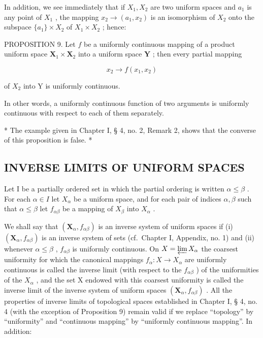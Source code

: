 In addition, we see immediately that if \(X_{1}, X_{2}\) are two uniform spaces and \(a_{1}\) is any point of \(X_{1}\) , the mapping \(x_{2} \to (a_{1}, x_{2})\) is an isomorphism of \(X_{2}\) onto the subspace \(\{a_{1}\} \times X_{2}\) of \(X_{1} \times X_{2}\) ; hence:

PROPOSITION 9. Let \(f\) be a uniformly continuous mapping of a product uniform space \(\mathbf{X}_1 \times \mathbf{X}_2\) into a uniform space \(\mathbf{Y}\) ; then every partial mapping

\[
x _ {2} \rightarrow f (x _ {1}, x _ {2})
\]

of \(X_{2}\) into Y is uniformly continuous.

In other words, a uniformly continuous function of two arguments is uniformly continuous with respect to each of them separately.

* The example given in Chapter I, § 4, no. 2, Remark 2, shows that the converse of this proposition is false. *

\subsection{INVERSE LIMITS OF UNIFORM SPACES}

Let I be a partially ordered set in which the partial ordering is written \(\alpha \leqslant \beta\) . For each \(\alpha \in I\) let \(X_{\alpha}\) be a uniform space, and for each pair of indices \(\alpha, \beta\) such that \(\alpha \leqslant \beta\) let \(f_{\alpha \beta}\) be a mapping of \(X_{\beta}\) into \(X_{\alpha}\) .

We shall say that \((\mathbf{X}_{\alpha}, f_{\alpha\beta})\) is an inverse system of uniform spaces if (i) \((\mathbf{X}_{\alpha}, f_{\alpha\beta})\) is an inverse system of sets (cf.~Chapter I, Appendix, no. 1) and (ii) whenever \(\alpha \leqslant \beta\) , \(f_{\alpha\beta}\) is uniformly continuous. On \(X = \varprojlim X_{\alpha}\) the coarsest uniformity for which the canonical mappings \(f_{\alpha}: X \to X_{\alpha}\) are uniformly continuous is called the inverse limit (with respect to the \(f_{\alpha\beta}\) ) of the uniformities of the \(X_{\alpha}\) , and the set X endowed with this coarsest uniformity is called the inverse limit of the inverse system of uniform spaces \((\mathbf{X}_{\alpha}, f_{\alpha\beta})\) . All the properties of inverse limits of topological spaces established in Chapter I, § 4, no. 4 (with the exception of Proposition 9) remain valid if we replace ``topology'' by ``uniformity'' and ``continuous mapping'' by ``uniformly continuous mapping''. In addition:

